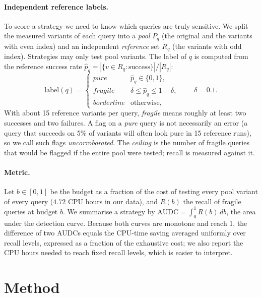 \documentclass[11pt]{article}
\begin{document}
\paragraph{Independent reference labels.}
To score a strategy we need to know which queries are truly sensitive. We split the measured variants of each query into a \emph{pool} $P_q$ (the original and the variants with even index) and an independent \emph{reference} set $R_q$ (the variants with odd index). Strategies may only test pool variants. The label of $q$ is computed from the reference success rate $\hat p_q = |\{v\in R_q: \text{success}\}|/|R_q|$:
\begin{equation}
\mathrm{label}(q)=\begin{cases}
\textit{pure} & \hat p_q\in\{0,1\},\\
\textit{fragile} & \delta\le \hat p_q\le 1-\delta,\\
\textit{borderline} & \text{otherwise},
\end{cases}\qquad \delta=0.1 .
\end{equation}
With about 15 reference variants per query, \emph{fragile} means roughly at least two successes and two failures. A flag on a \emph{pure} query is not necessarily an error (a query that succeeds on 5\% of variants will often look pure in 15 reference runs), so we call such flags \emph{uncorroborated}. The \emph{ceiling} is the number of fragile queries that would be flagged if the entire pool were tested; recall is measured against it.

\paragraph{Metric.}
Let $b\in[0,1]$ be the budget as a fraction of the cost of testing every pool variant of every query ($4.72$ CPU hours in our data), and $R(b)$ the recall of fragile queries at budget $b$. We summarise a strategy by $\mathrm{AUDC}=\int_0^1 R(b)\,db$, the area under the detection curve. Because both curves are monotone and reach 1, the difference of two AUDCs equals the CPU-time saving averaged uniformly over recall levels, expressed as a fraction of the exhaustive cost; we also report the CPU hours needed to reach fixed recall levels, which is easier to interpret.

\section{Method}
\label{sec:method}
\end{document}
